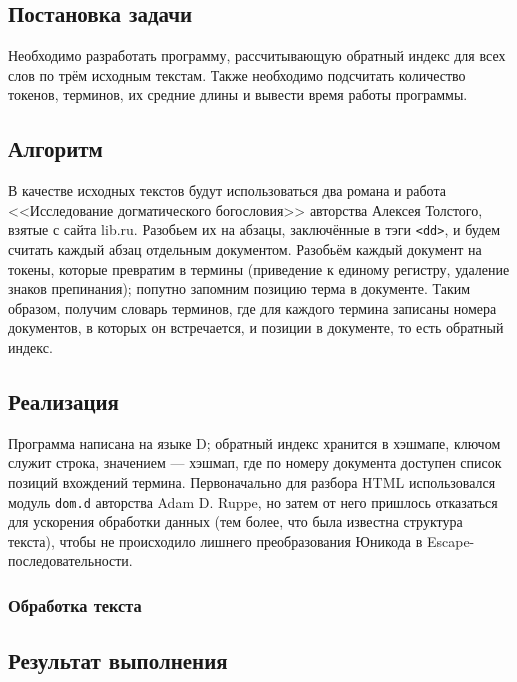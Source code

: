 \documentclass[a4paper, 12pt]{article}
\begin{document}

\newpage


\subsection*{Постановка задачи}
Необходимо разработать программу, рассчитывающую обратный индекс для всех слов по трём исходным текстам. Также необходимо подсчитать количество токенов, терминов, их средние длины и вывести время работы программы.


\subsection*{Алгоритм}
В качестве исходных текстов будут использоваться два романа и работа <<Исследование догматического богословия>> авторства Алексея Толстого, взятые с сайта lib.ru. Разобьем их на абзацы, заключённые в тэги {\tt <dd>}, и будем считать каждый абзац отдельным документом. Разобьём каждый документ на токены, которые превратим в термины (приведение к единому регистру, удаление знаков препинания); попутно запомним позицию терма в документе. Таким образом, получим словарь терминов, где для каждого термина записаны номера документов, в которых он встречается, и позиции в документе, то есть обратный индекс.


\subsection*{Реализация}
Программа написана на языке D; обратный индекс хранится в хэшмапе, ключом служит строка, значением --- хэшмап, где по номеру документа доступен список позиций вхождений термина. Первоначально для разбора HTML использовался модуль {\tt dom.d} авторства Adam D. Ruppe, но затем от него пришлось отказаться для ускорения обработки данных (тем более, что была известна структура текста), чтобы не происходило лишнего преобразования Юникода в Escape-последовательности.


\subsubsection*{Обработка текста}



\subsection*{Результат выполнения}


\vspace{1cm}
\end{document}
